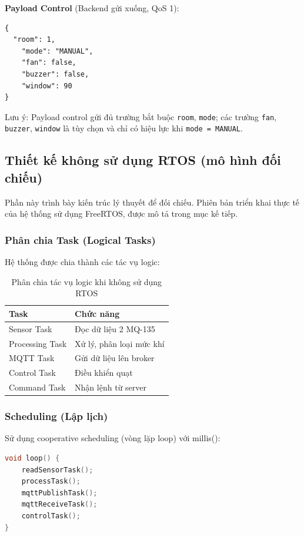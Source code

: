 \documentclass[../BTL_PTIT.tex]{subfiles}
\begin{document}
\textbf{Payload Control} (Backend gửi xuống, QoS 1):
\begin{lstlisting}[language={}]
{
  "room": 1,
    "mode": "MANUAL",
    "fan": false,
    "buzzer": false,
    "window": 90
}
\end{lstlisting}

Lưu ý: Payload control gửi đủ trường bắt buộc \texttt{room}, \texttt{mode}; các trường \texttt{fan}, \texttt{buzzer}, \texttt{window} là tùy chọn và chỉ có hiệu lực khi \texttt{mode = MANUAL}.

\subsection{Thiết kế không sử dụng RTOS (mô hình đối chiếu)}
Phần này trình bày kiến trúc lý thuyết để đối chiếu. Phiên bản triển khai thực tế của hệ thống sử dụng FreeRTOS, được mô tả trong mục kế tiếp.


\subsubsection{Phân chia Task (Logical Tasks)}
Hệ thống được chia thành các tác vụ logic:

\begin{table}[htbp]
\centering
\caption{Phân chia tác vụ logic khi không sử dụng RTOS}
\label{tab:logical_tasks_no_rtos}
\begin{tabular}{|l|l|}
\hline
\textbf{Task} & \textbf{Chức năng} \\
\hline
Sensor Task & Đọc dữ liệu 2 MQ-135 \\
Processing Task & Xử lý, phân loại mức khí \\
MQTT Task & Gửi dữ liệu lên broker \\
Control Task & Điều khiển quạt \\
Command Task & Nhận lệnh từ server \\
\hline
\end{tabular}
\end{table}

\subsubsection{Scheduling (Lập lịch)}
Sử dụng cooperative scheduling (vòng lặp loop) với millis():

\begin{lstlisting}[language=C]
void loop() {
    readSensorTask();
    processTask();
    mqttPublishTask();
    mqttReceiveTask();
    controlTask();
}
\end{lstlisting}
\end{document}
